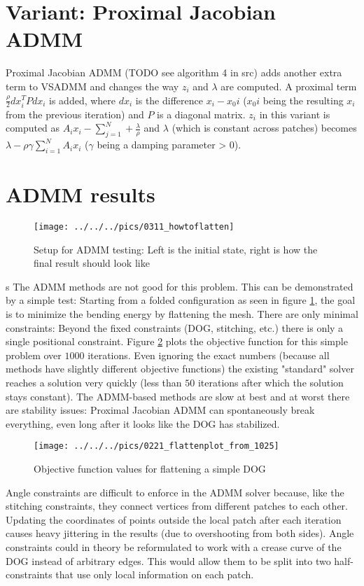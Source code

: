 \documentclass[a4paper,twoside,12pt,nochapterprefix]{scrbook}
\begin{document}
\section{Variant: Proximal Jacobian ADMM}
Proximal Jacobian ADMM (TODO see algorithm 4 in src) adds another extra term to VSADMM and changes the way $z_i$ and $\lambda$ are computed. A proximal term $\frac{\rho}{2} dx_i^T P dx_i$ is added, where $dx_i$ is the difference $x_i - x_0i$ ($x_0i$ being the resulting $x_i$ from the previous iteration) and $P$ is a diagonal matrix. $z_i$ in this variant is computed as $A_i x_i - \sum_{j=1}^N + \frac{\lambda}{\rho}$ and $\lambda$ (which is constant across patches) becomes $\lambda - \rho \gamma \sum_{i=1}^N A_i x_i$ ($\gamma$ being a damping parameter > 0).
\section{ADMM results}
\begin{figure}
    \centering
    \texttt{[image: ../../../pics/0311\_howtoflatten]}
    \caption{Setup for ADMM testing: Left is the initial state, right is how the final result should look like}
    \label{fig:admm_setup}
\end{figure}s
The ADMM methods are not good for this problem. This can be demonstrated by a simple test: Starting from a folded configuration as seen in figure \ref{fig:admm_setup}, the goal is to minimize the bending energy by flattening the mesh. There are only minimal constraints: Beyond the fixed constraints (DOG, stitching, etc.) there is only a single positional constraint.\newline
Figure \ref{fig:admm_results} plots the objective function for this simple problem over $1000$ iterations. Even ignoring the exact numbers (because all methods have slightly different objective functions) the existing "standard" solver reaches a solution very quickly (less than $50$ iterations after which the solution stays constant). The ADMM-based methods are slow at best and at worst there are stability issues: Proximal Jacobian ADMM can spontaneously break everything, even long after it looks like the DOG has stabilized.\newline
\begin{figure}
    \centering
    \texttt{[image: ../../../pics/0221\_flattenplot\_from\_1025]}
    \caption{Objective function values for flattening a simple DOG}
    \label{fig:admm_results}
\end{figure}
Angle constraints are difficult to enforce in the ADMM solver because, like the stitching constraints, they connect vertices from different patches to each other. Updating the coordinates of points outside the local patch after each iteration causes heavy jittering in the results (due to overshooting from both sides). Angle constraints could in theory be reformulated to work with a crease curve of the DOG instead of arbitrary edges. This would allow them to be split into two half-constraints that use only local information on each patch.\newline
\end{document}
